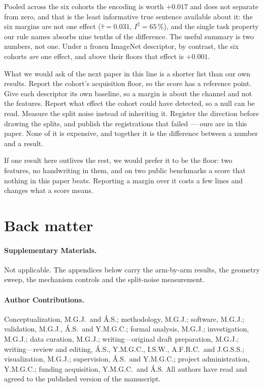 \documentclass[10pt,a4paper]{article}
\begin{document}
Pooled across the six cohorts the encoding is worth $+0.017$ and does not separate from zero, and
that is the least informative true sentence available about it: the six margins are not one effect
($\hat\tau = 0.031$, $I^2 = 65\,\%$), and the single task property our rule names absorbs nine
tenths of the difference. The useful summary is two numbers, not one. Under a frozen ImageNet
descriptor, by contrast, the six cohorts \emph{are} one effect, and above their floors that effect
is $+0.001$.

What we would ask of the next paper in this line is a shorter list than our own results. Report the
cohort's acquisition floor, so the score has a reference point. Give each descriptor its own
baseline, so a margin is about the channel and not the features. Report what effect the cohort could
have detected, so a null can be read. Measure the split noise instead of inheriting it. Register the
direction before drawing the splits, and publish the registrations that failed --- ours are in this
paper. None of it is expensive, and together it is the difference between a number and a result.

If one result here outlives the rest, we would prefer it to be the floor: two features, no
handwriting in them, and on two public benchmarks a score that nothing in this paper beats.
Reporting a margin over it costs a few lines and changes what a score means.

\section*{Back matter}

\paragraph{Supplementary Materials.} Not applicable. The appendices below carry the arm-by-arm
results, the geometry sweep, the mechanism controls and the split-noise measurement.

\paragraph{Author Contributions.}
Conceptualization, M.G.J.\ and \'A.S.; methodology, M.G.J.; software, M.G.J.; validation, M.G.J.,
\'A.S.\ and Y.M.G.C.; formal analysis, M.G.J.; investigation, M.G.J.; data curation, M.G.J.;
writing---original draft preparation, M.G.J.; writing---review and editing, \'A.S., Y.M.G.C.,
I.S.W., A.F.R.C.\ and J.G.S.S.; visualization, M.G.J.; supervision, \'A.S.\ and Y.M.G.C.; project
administration, Y.M.G.C.; funding acquisition, Y.M.G.C.\ and \'A.S. All authors have read and
agreed to the published version of the manuscript.
\end{document}

